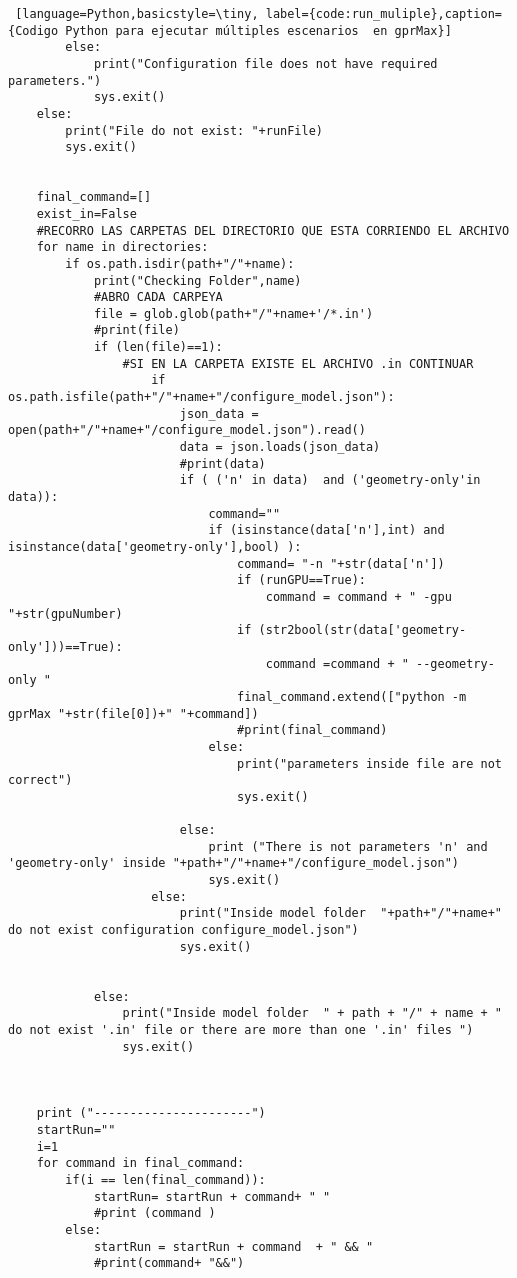 \begin{lstlisting} [language=Python,basicstyle=\tiny, label={code:run_muliple},caption= {Codigo Python para ejecutar múltiples escenarios  en gprMax}]
        else:
            print("Configuration file does not have required parameters.")
            sys.exit()
    else:
        print("File do not exist: "+runFile)
        sys.exit()


    final_command=[]
    exist_in=False
    #RECORRO LAS CARPETAS DEL DIRECTORIO QUE ESTA CORRIENDO EL ARCHIVO
    for name in directories:
        if os.path.isdir(path+"/"+name):
            print("Checking Folder",name)
            #ABRO CADA CARPEYA
            file = glob.glob(path+"/"+name+'/*.in')
            #print(file)
            if (len(file)==1):
                #SI EN LA CARPETA EXISTE EL ARCHIVO .in CONTINUAR
                    if os.path.isfile(path+"/"+name+"/configure_model.json"):
                        json_data = open(path+"/"+name+"/configure_model.json").read()
                        data = json.loads(json_data)
                        #print(data)
                        if ( ('n' in data)  and ('geometry-only'in data)):
                            command=""
                            if (isinstance(data['n'],int) and isinstance(data['geometry-only'],bool) ):
                                command= "-n "+str(data['n'])
                                if (runGPU==True):
                                    command = command + " -gpu "+str(gpuNumber)
                                if (str2bool(str(data['geometry-only']))==True):
                                    command =command + " --geometry-only "
                                final_command.extend(["python -m gprMax "+str(file[0])+" "+command])
                                #print(final_command)
                            else:
                                print("parameters inside file are not correct")
                                sys.exit()

                        else:
                            print ("There is not parameters 'n' and 'geometry-only' inside "+path+"/"+name+"/configure_model.json")
                            sys.exit()
                    else:
                        print("Inside model folder  "+path+"/"+name+" do not exist configuration configure_model.json")
                        sys.exit()


            else:
                print("Inside model folder  " + path + "/" + name + " do not exist '.in' file or there are more than one '.in' files ")
                sys.exit()



    print ("----------------------")
    startRun=""
    i=1
    for command in final_command:
        if(i == len(final_command)):
            startRun= startRun + command+ " "
            #print (command )
        else:
            startRun = startRun + command  + " && "
            #print(command+ "&&")


\end{lstlisting}
